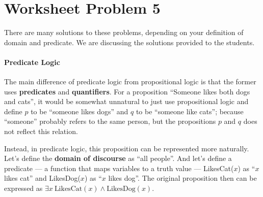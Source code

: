 \documentclass[10pt]{article}
\title{}
\begin{document}
\pagestyle{fancy}
\fancyhf{} %
\cfoot{\thepage}
\renewcommand{\headrulewidth}{1pt}

\section{Worksheet Problem 5}

There are many solutions to these problems, depending on your definition of domain and predicate. We are discussing the solutions provided to the students.

\paragraph{Predicate Logic} The main difference of predicate logic from propositional logic is that the former uses \textbf{predicates} and \textbf{quantifiers}. For a proposition ``Someone likes both dogs and cats'', it would be somewhat unnatural to just use propositional logic and define $p$ to be ``someone likes dogs'' and $q$ to be ``someone like cats''; because ``someone'' probably refers to the same person, but the propositions $p$ and $q$ does not reflect this relation.

Instead, in predicate logic, this proposition can be represented more naturally. Let's define the \textbf{domain of discourse} as ``all people''. And let's define a predicate --- a function that maps variables to a truth value --- LikesCat($x$) as ``$x$ likes cat'' and LikesDog($x$) as ``$x$ likes dog''. The original proposition then can be expressed as $\exists x\ \text{LikesCat}(x)\land\text{LikesDog}(x)$.
\end{document}
